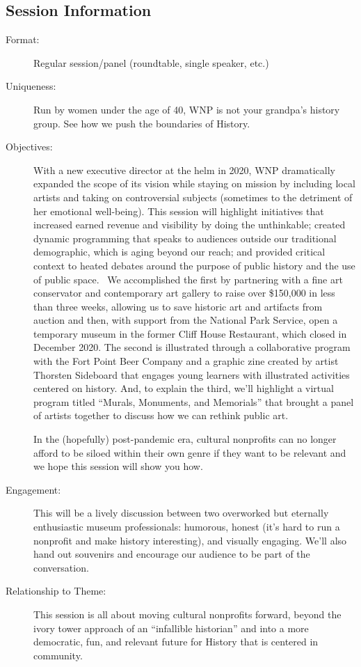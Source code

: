 \documentclass{report}
\begin{document}
              \subsection*{Session Information}
                \begin{description}
                  \item [Format:] Regular session/panel (roundtable, single speaker, etc.)
							    
							    \item [Uniqueness:]Run by women under the age of 40, WNP is not your grandpa’s history group. See how we push the boundaries of History.
							    \item [Objectives:]With a new executive director at the helm in 2020, WNP dramatically expanded the scope of its vision while staying on mission by including local artists and taking on controversial subjects (sometimes to the detriment of her emotional well-being). This session will highlight initiatives that increased earned revenue and visibility by doing the unthinkable; created dynamic programming that speaks to audiences outside our traditional demographic, which is aging beyond our reach; and provided critical context to heated debates around the purpose of public history and the use of public space. 
We accomplished the first by partnering with a fine art conservator and contemporary art gallery to raise over \$150,000 in less than three weeks, allowing us to save historic art and artifacts from auction and then, with support from the National Park Service, open a temporary museum in the former Cliff House Restaurant, which closed in December 2020. The second is illustrated through a collaborative program with the Fort Point Beer Company and a graphic zine created by artist Thorsten Sideboard that engages young learners with illustrated activities centered on history. And, to explain the third, we’ll highlight a virtual program titled “Murals, Monuments, and Memorials” that brought a panel of artists together to discuss how we can rethink public art. 

In the (hopefully) post-pandemic era, cultural nonprofits can no longer afford to be siloed within their own genre if they want to be relevant and we hope this session will show you how.
							    \item [Engagement:]This will be a lively discussion between two overworked but eternally enthusiastic museum professionals: humorous, honest (it’s hard to run a nonprofit and make history interesting), and visually engaging. We’ll also hand out souvenirs and encourage our audience to be part of the conversation.
							    \item [Relationship to Theme:]This session is all about moving cultural nonprofits forward, beyond the ivory tower approach of an “infallible historian” and into a more democratic, fun, and relevant future for History that is centered in community.
							    
                \end{description}
\end{document}
